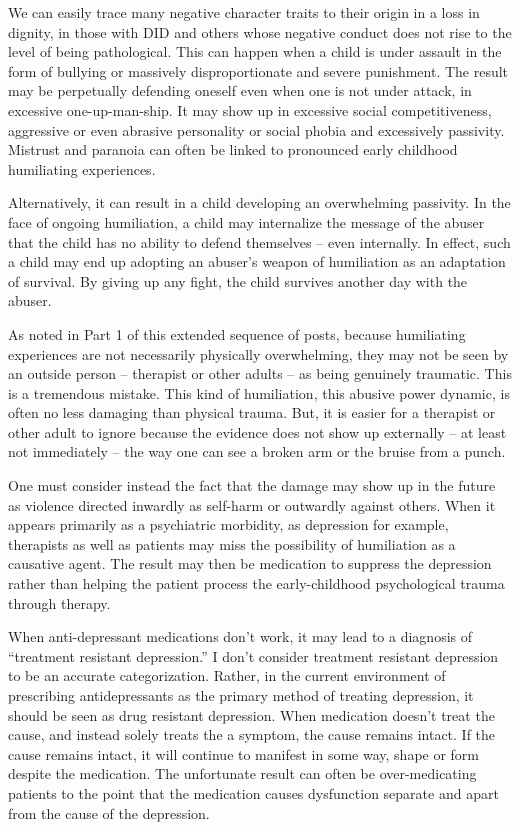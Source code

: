 \documentclass[]{book}
\begin{document}
We can easily trace many negative character traits to their origin in a loss in dignity, in those with DID and others whose negative conduct does not rise to the level of being pathological. This can happen when a child is under assault in the form of bullying or massively disproportionate and severe punishment. The result may be perpetually defending oneself even when one is not under attack, in excessive one-up-man-ship. It may show up in excessive social competitiveness, aggressive or even abrasive personality or social phobia and excessively passivity. Mistrust and paranoia can often be linked to pronounced early childhood humiliating experiences.

Alternatively, it can result in a child developing an overwhelming passivity. In the face of ongoing humiliation, a child may internalize the message of the abuser that the child has no ability to defend themselves -- even internally. In effect, such a child may end up adopting an abuser's weapon of humiliation as an adaptation of survival. By giving up any fight, the child survives another day with the abuser.

As noted in Part 1 of this extended sequence of posts, because humiliating experiences are not necessarily physically overwhelming, they may not be seen by an outside person -- therapist or other adults -- as being genuinely traumatic. This is a tremendous mistake. This kind of humiliation, this abusive power dynamic, is often no less damaging than physical trauma. But, it is easier for a therapist or other adult to ignore because the evidence does not show up externally -- at least not immediately -- the way one can see a broken arm or the bruise from a punch.

One must consider instead the fact that the damage may show up in the future as violence directed inwardly as self-harm or outwardly against others. When it appears primarily as a psychiatric morbidity, as depression for example, therapists as well as patients may miss the possibility of humiliation as a causative agent. The result may then be medication to suppress the depression rather than helping the patient process the early-childhood psychological trauma through therapy.

When anti-depressant medications don't work, it may lead to a diagnosis of ``treatment resistant depression.'' I don't consider treatment resistant depression to be an accurate categorization. Rather, in the current environment of prescribing antidepressants as the primary method of treating depression, it should be seen as drug resistant depression. When medication doesn't treat the cause, and instead solely treats the a symptom, the cause remains intact. If the cause remains intact, it will continue to manifest in some way, shape or form despite the medication. The unfortunate result can often be over-medicating patients to the point that the medication causes dysfunction separate and apart from the cause of the depression.
\end{document}
